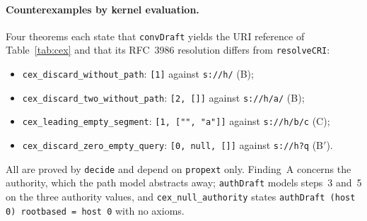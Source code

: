 \documentclass[11pt,a4paper]{article}
\theoremstyle{remark}
\newcommand{\lean}[1]{\texttt{#1}}
\newcommand{\cri}[1]{\texttt{#1}}
\newcommand{\uri}[1]{\texttt{#1}}
\begin{document}
\paragraph{Counterexamples by kernel evaluation.} Four theorems each state that \lean{convDraft}
yields the URI reference of Table~\ref{tab:cex} and that its RFC~3986 resolution differs from
\lean{resolveCRI}:
\begin{itemize}[nosep]
\item \lean{cex\_discard\_without\_path}: \cri{[1]} against \uri{s://h/} (B);
\item \lean{cex\_discard\_two\_without\_path}: \cri{[2, []]} against \uri{s://h/a/} (B);
\item \lean{cex\_leading\_empty\_segment}: \cri{[1, ["", "a"]]} against \uri{s://h/b/c} (C);
\item \lean{cex\_discard\_zero\_empty\_query}: \cri{[0, null, []]} against \uri{s://h?q} (B$'$).
\end{itemize}
All are proved by \lean{decide} and depend on \lean{propext} only.
Finding~A concerns the authority, which the path model abstracts away; \lean{authDraft} models steps~3
and~5 on the three authority values, and \lean{cex\_null\_authority} states
\lean{authDraft (host 0) rootbased = host 0} with no axioms.
\end{document}
